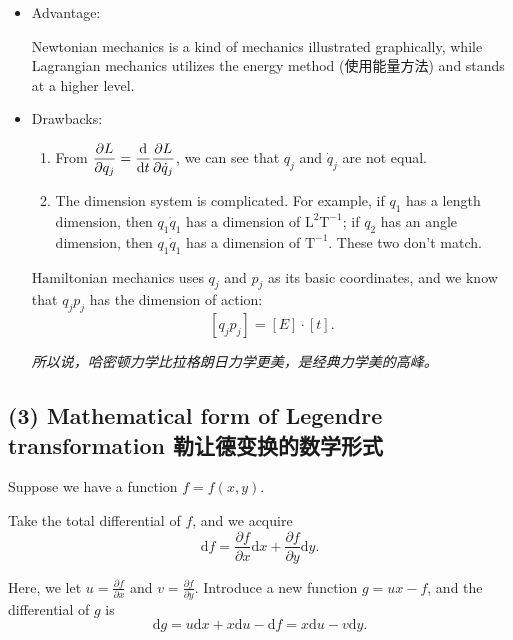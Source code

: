 \begin{itemize}
\tightlist{}
\item
  Advantage:

  Newtonian mechanics is a kind of mechanics illustrated graphically,
  while Lagrangian mechanics utilizes the energy method (使用能量方法)
  and stands at a higher level.
\item
  Drawbacks:

  \begin{enumerate}
  \def\labelenumi{\arabic{enumi}.}
  \tightlist{}
  \item
    From
    \(\displaystyle {\partial L \over \partial{q}_j} = {\mathrm{d} \over \mathrm{d}t} {\partial L \over \partial \dot{q}_j}\),
    we can see that \({q}_j\) and \(\dot{q}_j\) are not equal.
  \item
    The dimension system is complicated. For example, if \(q_1\) has a
    length dimension, then \(q_1 \dot{q}_1\) has a dimension of
    \(\mathrm{L^2T^{-1}}\); if \(q_2\) has an angle dimension, then
    \(q_1 \dot{q}_1\) has a dimension of \(\mathrm{T^{-1}}\). These two
    don't match.
  \end{enumerate}

  Hamiltonian mechanics uses \(q_j\) and \(p_j\) as its basic
  coordinates, and we know that \(q_j p_j\) has the dimension of action:
  \[[q_j p_j] = [E] \cdot [t].\]

  \emph{所以说，哈密顿力学比拉格朗日力学更美，是经典力学美的高峰。}
\end{itemize}

\subsection*{(3) Mathematical form of Legendre transformation
勒让德变换的数学形式}\label{mathematical-form-of-legendre-transformation-ux52d2ux8ba9ux5fb7ux53d8ux6362ux7684ux6570ux5b66ux5f62ux5f0f}

Suppose we have a function \(f = f(x, y)\).

Take the total differential of \(f\), and we acquire
\[\mathrm{d}f = \frac{\partial f}{\partial x} \mathrm{d}x + \frac{\partial f}{\partial y} \mathrm{d}y.\]

Here, we let \(\displaystyle u = \frac{\partial f}{\partial x}\) and
\(\displaystyle v = \frac{\partial f}{\partial y}\). Introduce a new
function \(g = ux - f\), and the differential of \(g\) is
\[\mathrm{d}g = u \mathrm{d}x + x \mathrm{d}u - \mathrm{d}f = x \mathrm{d}u - v \mathrm{d}y.\]


